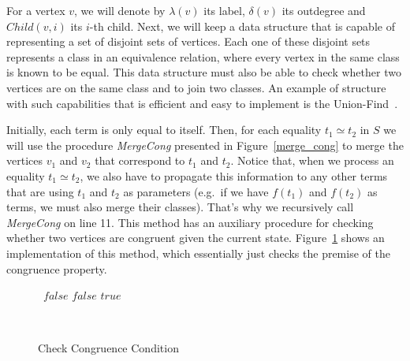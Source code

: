\begin{figure}[h]
\centering
{}
\end{figure}

For a vertex $v$, we will denote by $\lambda(v)$ its label, $\delta(v)$ its outdegree and $Child(v, i)$ its $i$-th child.
Next, we will keep a data structure that is capable of representing a set of disjoint sets of vertices. Each one of these disjoint sets represents a class in an equivalence relation, where every vertex in the same class is known to be equal. This data structure must also be able to check whether two vertices are on the same class and to join two classes. An example of structure with such capabilities that is efficient and easy to implement is the Union-Find~\cite{union_find}.

Initially, each term is only equal to itself. Then, for each equality $t_{1} \simeq t_{2}$ in $S$ we will use the procedure \textit{MergeCong} presented in Figure~\ref{merge_cong} to merge the vertices $v_{1}$ and $v_{2}$ that correspond to $t_{1}$ and $t_{2}$.
Notice that, when we process an equality $t_{1} \simeq t_{2}$, we also have to propagate this information to any other terms that are using $t_{1}$ and $t_{2}$ as parameters (e.g.~if we have $f(t_{1})$ and $f(t_{2})$ as terms, we must also merge their classes). That's why we recursively call \textit{MergeCong} on line 11.
This method has an auxiliary procedure for checking whether two vertices are congruent given the current state. Figure~\ref{cong_cond} shows an implementation of this method, which essentially just checks the premise of the congruence property.

\begin{figure}[t]
\begin{algorithmic}[1]
    \State\Return~$false$
  \EndIf
      \State\Return $false$
    \EndIf
  \EndFor
  \State\Return $true$
  \EndFunction
\end{algorithmic}
\caption{Check Congruence Condition}~\label{cong_cond}
\end{figure}



